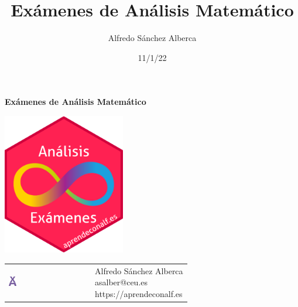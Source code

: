 \documentclass[
  a4paper,
]{scrreport}
\title{Exámenes de Análisis Matemático}
\author{Alfredo Sánchez Alberca}
\date{11/1/22}
\renewcommand*\contentsname{Tabla de contenidos}
\newcommand\contentsname{Tabla de contenidos}
\theoremstyle{definition}
\theoremstyle{remark}
\begin{document}
\begin{titlepage}

\begin{center}
\vspace*{5cm}

\Huge
{\textbf{\textsf{Exámenes de Análisis Matemático}}}

\vspace{0.5cm}
\LARGE
{\textbf{\textsf{}}}

\vspace{1.5cm}

\includegraphics[width=0.4\textwidth]{img/logos/sticker.png}
\end{center}

\vfill

\begin{flushleft}
\begin{tabular}{ll}
\includegraphics[width=0.1\textwidth]{img/logos/aprendeconalf.png} & \parbox[b]{5cm}{\Large\textsf{Alfredo
Sánchez
Alberca}\\ \textsf{asalber@ceu.es} \\ \textsf{https://aprendeconalf.es}}
\end{tabular}
\end{flushleft}
\end{titlepage}\ifdefined\Shaded\renewenvironment{Shaded}{\begin{tcolorbox}[boxrule=0pt, interior hidden, enhanced, borderline west={3pt}{0pt}{shadecolor}, sharp corners, frame hidden, breakable]}{\end{tcolorbox}}\fi

\renewcommand*\contentsname{Tabla de contenidos}
{
\hypersetup{linkcolor=}
\setcounter{tocdepth}{2}
\tableofcontents
}
\end{document}
